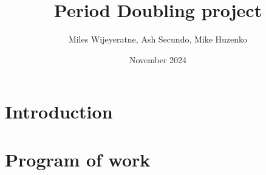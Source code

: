 \documentclass{article}
\title{Period Doubling project}
\author{Miles Wijeyeratne, Ash Secundo, Mike Huzenko}
\date{November 2024}
\begin{document}
\maketitle
\tableofcontents
\newpage

\section{Introduction}
\section{Program of work}
\end{document}
